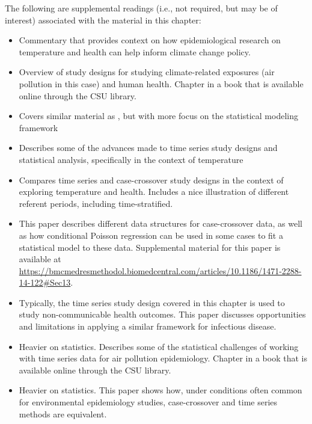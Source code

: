\documentclass[
]{book}
\providecommand{\tightlist}{%
  \setlength{\itemsep}{0pt}\setlength{\parskip}{0pt}}
\begin{document}
The following are supplemental readings (i.e., not required, but may be of
interest) associated with the material in this chapter:

\begin{itemize}
\tightlist
\item
  \citet{armstrong2012commentary} Commentary that provides context on how epidemiological
  research on temperature and health can help inform climate change policy.
\item
  \citet{dominici2008statistical1} Overview of study designs for studying climate-related
  exposures (air pollution in this case) and human health. Chapter in a book that is
  available online through the CSU library.
\item
  \citet{armstrong2006models} Covers similar material as \citet{bhaskaran2013time}, but with
  more focus on the statistical modeling framework
\item
  \citet{gasparrini2010time} Describes some of the advances made to time series study
  designs and statistical analysis, specifically in the context of temperature
\item
  \citet{basu2005temperature} Compares time series and case-crossover study designs in
  the context of exploring temperature and health. Includes a nice illustration
  of different referent periods, including time-stratified.
\item
  \citet{armstrong2014conditional} This paper describes different data structures for
  case-crossover data, as well as how conditional Poisson regression can be used
  in some cases to fit a statistical model to these data.
  Supplemental material for this paper is available at
  \url{https://bmcmedresmethodol.biomedcentral.com/articles/10.1186/1471-2288-14-122\#Sec13}.
\item
  \citet{imai2015time} Typically, the time series study design covered in this
  chapter is used to study non-communicable health outcomes. This paper discusses
  opportunities and limitations in applying a similar framework for infectious
  disease.
\item
  \citet{dominici2008statistical4} Heavier on statistics. Describes some of the
  statistical challenges of working with time series data for air pollution
  epidemiology. Chapter in a book that is available online through the CSU library.
\item
  \citet{lu2007equivalence} Heavier on statistics. This paper shows how, under
  conditions often common for environmental epidemiology studies, case-crossover
  and time series methods are equivalent.

\end{itemize}
\end{document}
